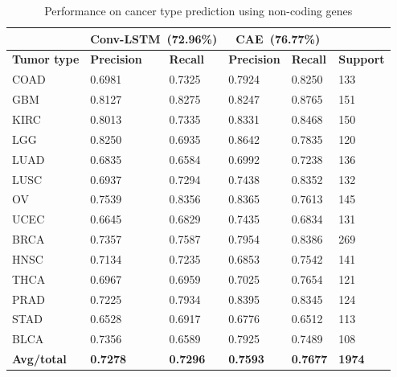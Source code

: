 \begin{table} [h]
\caption{Performance on cancer type prediction using non-coding genes}
\label{table:codingene} %
    \begin{center}
        \vspace{-5mm}
    \scriptsize
        \begin{tabular}{l|ll|ll|l}
        \hline
        \rowcolor{Gray}
        {} & \multicolumn{2}{c}{\textbf{Conv-LSTM~(72.96\%)}} & \multicolumn{2}{c}{\textbf{CAE~(76.77\%)}} &  {} \\\hline
        \textbf{Tumor type} & \textbf{Precision} &  \textbf{Recall}  & \textbf{Precision} &  \textbf{Recall} & \textbf{Support} \\\hline
        COAD    & 0.6981  &  0.7325 & 0.7924 &    0.8250 & 133  \\\hline
        GBM     & 0.8127  &  0.8275 & 0.8247 &   0.8765  & 151  \\\hline
        KIRC    & 0.8013  &  0.7335 & 0.8331 &   0.8468  & 150  \\\hline
        LGG     & 0.8250  &  0.6935 & 0.8642 &   0.7835 & 120  \\\hline
        LUAD    & 0.6835  &  0.6584 & 0.6992 &   0.7238 & 136  \\\hline
        LUSC    & 0.6937  &  0.7294 & 0.7438 &   0.8352 & 132  \\\hline
        OV      & 0.7539  &  0.8356 & 0.8365 &   0.7613 & 145  \\\hline
        UCEC    & 0.6645  &  0.6829 & 0.7435 &   0.6834 & 131  \\\hline
        BRCA    & 0.7357  &  0.7587 & 0.7954 &   0.8386 & 269  \\\hline
        HNSC    & 0.7134  &  0.7235 & 0.6853 &   0.7542 & 141  \\\hline
        THCA    & 0.6967 &  0.6959 & 0.7025 &   0.7654 & 121  \\\hline
        PRAD    & 0.7225  &  0.7934 & 0.8395 &   0.8345 & 124  \\\hline
        STAD    & 0.6528  &  0.6917 & 0.6776 &   0.6512 & 113  \\\hline
        BLCA    & 0.7356  &  0.6589 & 0.7925 &   0.7489 & 108  \\\hline
        \rowcolor{LightCyan}
        \textbf{Avg/total} & \textbf{0.7278} &    \textbf{0.7296} & \textbf{0.7593} &    \textbf{0.7677} & \textbf{1974}  \\\hline
        \end{tabular}
        \vspace{-4mm}
    \end{center}
\end{table}

